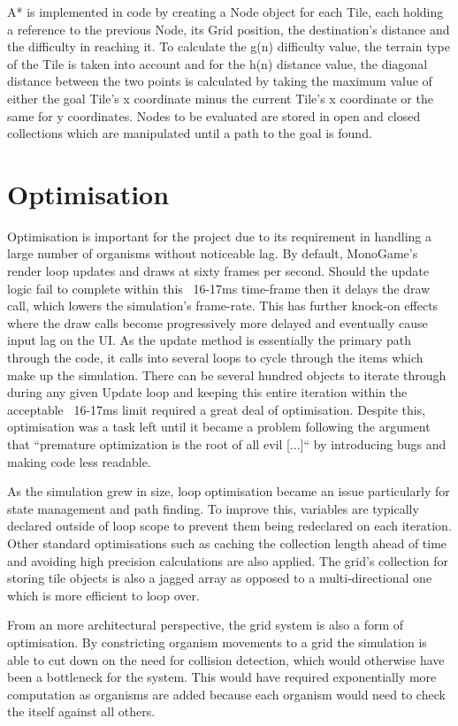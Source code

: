\documentclass[a4paper, oneside, 11pt]{report}
\begin{document}
A* is implemented in code by creating a Node object for each Tile, each holding a reference to the previous Node, its Grid position, the destination's distance and the difficulty in reaching it. To calculate the g(n) difficulty value, the terrain type of the Tile is taken into account and for the h(n) distance value, the diagonal distance between the two points is calculated by taking the maximum value of either the goal Tile's x coordinate minus the current Tile's x coordinate or the same for y coordinates. Nodes to be evaluated are stored in open and closed collections which are manipulated until a path to the goal is found.

\section{Optimisation}\label{optim}
Optimisation is important for the project due to its requirement in handling a large number of organisms without noticeable lag. By default, MonoGame's render loop updates and draws at sixty frames per second. Should the update logic fail to complete within this ~16-17ms time-frame then it delays the draw call, which lowers the simulation's frame-rate. This has further knock-on effects where the draw calls become progressively more delayed and eventually cause input lag on the UI. As the update method is essentially the primary path through the code, it calls into several loops to cycle through the items which make up the simulation. There can be several hundred objects to iterate through during any given Update loop and keeping this entire iteration within the acceptable ~16-17ms limit required a great deal of optimisation. Despite this, optimisation was a task left until it became a problem following the argument that ``premature optimization is the root of all evil [...]`` \cite{knuth} by introducing bugs and making code less readable. 

As the simulation grew in size, loop optimisation became an issue particularly for state management and path finding. To improve this, variables are typically declared outside of loop scope to prevent them being redeclared on each iteration. Other standard optimisations such as caching the collection length ahead of time and avoiding high precision calculations are also applied. The grid's collection for storing tile objects is also a jagged array as opposed to a multi-directional one which is more efficient to loop over.

From an more architectural perspective, the grid system is also a form of optimisation. By constricting organism movements to a grid the simulation is able to cut down on the need for collision detection, which would otherwise have been a bottleneck for the system. This would have required exponentially more computation as organisms are added because each organism would need to check the itself against all others.
\end{document}
